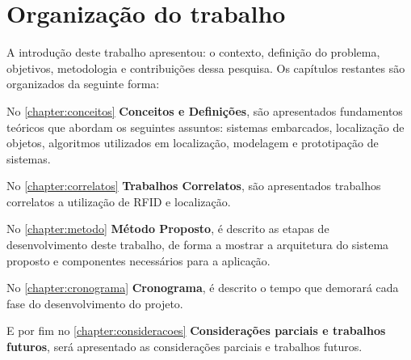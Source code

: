 \section{Organização do trabalho}
A introdução deste trabalho apresentou: o contexto, definição do problema, objetivos, metodologia e contribuições dessa pesquisa. Os capítulos restantes são organizados da seguinte forma:

\par
No \autoref{chapter:conceitos} \textbf{Conceitos e Definições}, são apresentados fundamentos teóricos que abordam os seguintes assuntos: sistemas embarcados, localização de objetos, algoritmos utilizados em localização, modelagem e prototipação de sistemas.

\par
No \autoref{chapter:correlatos} \textbf{Trabalhos Correlatos}, são apresentados trabalhos correlatos a utilização de RFID e localização.

\par
No \autoref{chapter:metodo} \textbf{Método Proposto}, é descrito as etapas de desenvolvimento deste trabalho, de forma a mostrar a arquitetura do sistema proposto e componentes necessários para a aplicação.

\par
No \autoref{chapter:cronograma} \textbf{Cronograma}, é descrito o tempo que demorará cada fase do desenvolvimento do projeto.

\par
E por fim no \autoref{chapter:consideracoes} \textbf{Considerações parciais e trabalhos futuros}, será apresentado as considerações parciais e trabalhos futuros.